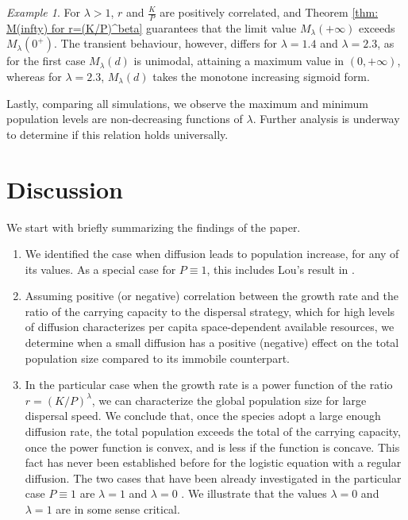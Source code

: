 \documentclass[11pt]{article}
\theoremstyle{definition}
\theoremstyle{remark}
\newtheorem{example}[statement]{Example}
\begin{document}
\begin{example}
For $\lambda >1$, $r$ and $\frac{K}{P}$ are positively correlated, and Theorem \ref{thm: M(infty) for r=(K/P)^beta} guarantees that the limit value $M_\lambda(+\infty)$ exceeds $M_\lambda(0^+)$.  The transient behaviour, however, differs for $\lambda=1.4$ and $\lambda=2.3$, as for the first case $M_\lambda(d)$ is unimodal, attaining a maximum value in $(0,+\infty)$, whereas for $\lambda=2.3$, $M_\lambda(d)$ takes the monotone increasing sigmoid form.

Lastly, comparing all simulations, we observe the maximum and minimum population levels are non-decreasing functions of $\lambda$. Further analysis is underway to determine if this relation holds universally.
\end{example}


\section{Discussion}
\label{sec:discussion}


We start with briefly  summarizing the findings of the paper. 

\begin{enumerate}
\item
We identified the case when diffusion leads to population increase, for any of its values.
As a special case for $P \equiv 1$, this includes Lou's result in \cite{Lou}.

\item
Assuming positive (or negative) correlation between the growth rate  and the ratio of the carrying capacity to the dispersal strategy, 
which for high levels of diffusion characterizes per capita space-dependent available resources,
we determine when a small diffusion has a positive (negative) effect on the total population size compared to its immobile counterpart.


\item
In the particular case when the growth rate is a power function of the ratio $r=(K/P)^{\lambda}$, we can characterize the global population size for large dispersal speed.
We conclude that, once the species adopt a large enough diffusion rate, the total population exceeds the total of the carrying capacity, once 
the power function is convex, and is less if the function is concave. This fact has never been established before for the logistic equation with a regular diffusion. 
The two cases that have been already investigated in the particular case $P \equiv 1$ are $\lambda=1$  \cite{Lou} and $\lambda=0$ \cite{Guo_2020}.
We illustrate that the values   $\lambda=0$ and $\lambda=1$ are in some sense critical.
\end{enumerate}
  
\end{document}
